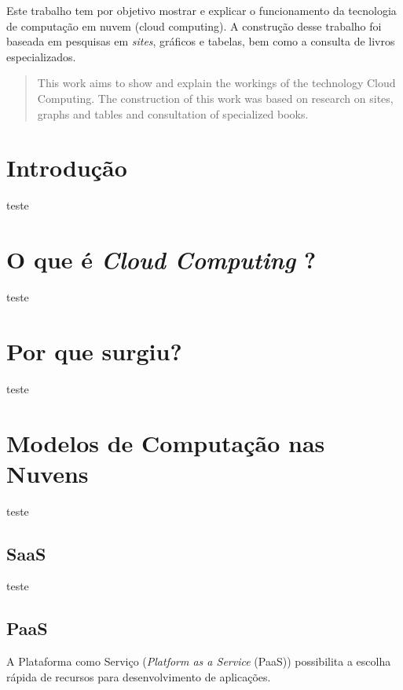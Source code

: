 \documentclass{abnt}
\begin{document}
	\capa
	
	\folhaderosto
	
	\begin{resumo}
		Este trabalho tem por objetivo mostrar e explicar o funcionamento da tecnologia de computação em nuvem (cloud computing). 
		A construção desse trabalho foi baseada em pesquisas em \textit{sites}, gráficos e tabelas, bem como a consulta de livros especializados.
	\end{resumo}

	\begin{abstract}
		This work aims to show and explain the workings of the technology Cloud Computing. The construction of this work was based on research on sites, graphs and tables and consultation of specialized books.
	\end{abstract}
	
	\sumario
	
	\listadetabelas
	
	\listadefiguras
	
	\newpage
	
	\section{Introdução}
		teste
	\section{O que é \textit{Cloud Computing} ?}
		teste
	\section{Por que surgiu?}
		teste
	\section{Modelos de Computação nas Nuvens}
		teste
	\subsection{SaaS}
		teste
	\subsection{PaaS}
		A Plataforma como Serviço (\textit{Platform as a Service} (PaaS)) possibilita a escolha rápida de recursos para desenvolvimento de aplicações.
		
\end{document}

